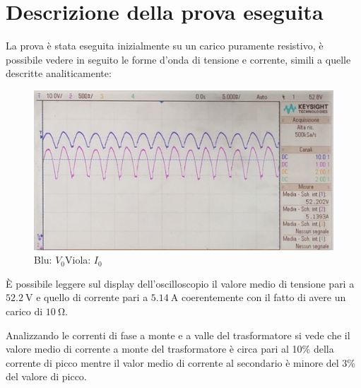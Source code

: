 \documentclass[a4paper,10pt]{article}
\begin{document}
\section{Descrizione della prova eseguita}
La prova è stata eseguita inizialmente su un carico puramente resistivo, 
è possibile vedere in seguito le forme d'onda di tensione e corrente, simili a quelle 
descritte analiticamente:
\begin{figure}[H]
\centering
 \includegraphics[keepaspectratio=true,width=0.9\linewidth]
 {tensione_e_corrente_2_neg.jpg}
 \caption{Blu: \(V_0\)\quad Viola: \(I_0\)}
 \label{fig:tensioni_carico_R}
\end{figure}
È possibile leggere sul display dell'oscilloscopio il valore medio di tensione pari
a $\SI{52.2}{\volt}$ e quello di corrente pari a $\SI{5.14}{\ampere}$ coerentemente
con il fatto di avere un carico di $\SI{10}{\ohm}$.

Analizzando le correnti di fase a monte e a valle del trasformatore si vede che il
valore medio di corrente a monte del trasformatore è circa pari al 10\% della 
corrente di picco mentre il valor medio di corrente al secondario è minore del 3\%
del valore di picco.
\end{document}
